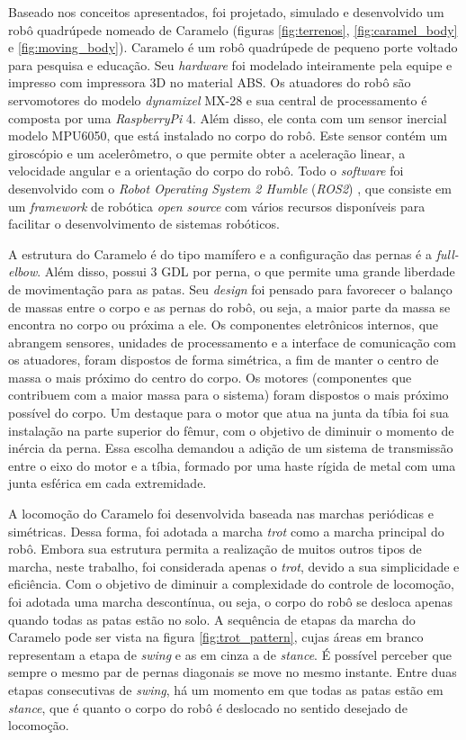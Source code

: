 \documentclass[conference]{IEEEtran}
\begin{document}
Baseado nos conceitos apresentados, foi projetado, simulado e desenvolvido um robô quadrúpede nomeado de Caramelo (figuras \ref{fig:terrenos}, \ref{fig:caramel_body} e \ref{fig:moving_body}). Caramelo é um robô quadrúpede de pequeno porte voltado para pesquisa e educação. Seu \textit{hardware} foi modelado inteiramente pela equipe e impresso com impressora 3D no material ABS. Os atuadores do robô são servomotores do modelo \textit{dynamixel} MX-28 e sua central de processamento é composta por uma \textit{RaspberryPi} 4. Além disso, ele conta com um sensor inercial modelo MPU6050, que está instalado no corpo do robô. Este sensor contém um giroscópio e um acelerômetro, o que permite obter a aceleração linear, a velocidade angular e a orientação do corpo do robô. Todo o \textit{software} foi desenvolvido com o \textit{Robot Operating System 2 Humble} (\textit{ROS2}) \cite{ROS2Humble}, que consiste em um \textit{framework} de robótica \textit{open source} com vários recursos disponíveis para facilitar o desenvolvimento de sistemas robóticos.

A estrutura do Caramelo é do tipo mamífero e a configuração das pernas é a \textit{full-elbow}. Além disso, possui 3 GDL por perna, o que permite uma grande liberdade de movimentação para as patas. Seu \textit{design} foi pensado para favorecer o balanço de massas entre o corpo e as pernas do robô, ou seja, a maior parte da massa se encontra no corpo ou próxima a ele. Os componentes eletrônicos internos, que abrangem sensores, unidades de processamento e a interface de comunicação com os atuadores, foram dispostos de forma simétrica, a fim de manter o centro de massa o mais próximo do centro do corpo. Os motores (componentes que contribuem com a maior massa para o sistema) foram dispostos o mais próximo possível do corpo. Um destaque para o motor que atua na junta da tíbia foi sua instalação na parte superior do fêmur, com o objetivo de diminuir o momento de inércia da perna. Essa escolha demandou a adição de um sistema de transmissão entre o eixo do motor e a tíbia, formado por uma haste rígida de metal com uma junta esférica em cada extremidade.

A locomoção do Caramelo foi desenvolvida baseada nas marchas periódicas e simétricas. Dessa forma, foi adotada a marcha \textit{trot} como a marcha principal do robô. Embora sua estrutura permita a realização de muitos outros tipos de marcha, neste trabalho, foi considerada apenas o \textit{trot}, devido a sua simplicidade e eficiência. Com o objetivo de diminuir a complexidade do controle de locomoção, foi adotada uma marcha descontínua, ou seja, o corpo do robô se desloca apenas quando todas as patas estão no solo. A sequência de etapas da marcha do Caramelo pode ser vista na figura \ref{fig:trot_pattern}, cujas áreas em branco representam a etapa de \textit{swing} e as em cinza a de \textit{stance}. É possível perceber que sempre o mesmo par de pernas diagonais se move no mesmo instante. Entre duas etapas consecutivas de \textit{swing}, há um momento em que todas as patas estão em \textit{stance}, que é quanto o corpo do robô é deslocado no sentido desejado de locomoção.
\end{document}
